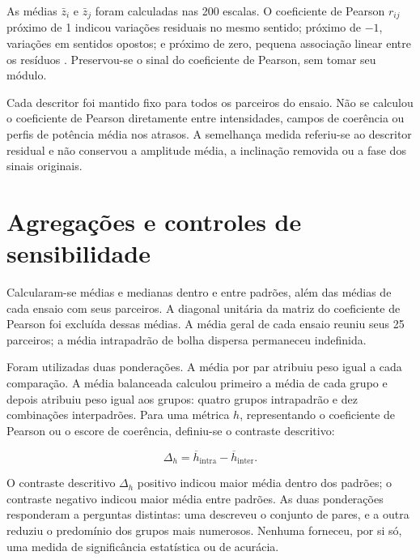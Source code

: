 \noindent
As médias $\bar z_i$ e $\bar z_j$ foram calculadas nas 200 escalas. O coeficiente
de Pearson $r_{ij}$ próximo de 1 indicou variações residuais no mesmo sentido;
próximo de $-1$, variações em sentidos opostos; e próximo de zero, pequena
associação linear entre os resíduos \cite{cunningham2020}. Preservou-se o sinal
do coeficiente de Pearson, sem tomar seu módulo.

Cada descritor foi mantido fixo para todos os parceiros do ensaio. Não se calculou
o coeficiente de Pearson diretamente entre intensidades, campos de coerência ou
perfis de potência média nos atrasos. A semelhança medida referiu-se ao descritor
residual e não conservou a amplitude média, a inclinação removida ou a fase dos
sinais originais.

\section{Agregações e controles de sensibilidade}\label{sec:met-agregacao}

Calcularam-se médias e medianas dentro e entre padrões, além das médias de cada
ensaio com seus parceiros. A diagonal unitária da matriz do coeficiente de
Pearson foi excluída dessas médias. A média geral de cada ensaio reuniu seus 25
parceiros; a média intrapadrão de bolha dispersa permaneceu indefinida.

Foram utilizadas duas ponderações. A média por par atribuiu peso igual a cada
comparação. A média balanceada calculou primeiro a média de cada grupo e depois
atribuiu peso igual aos grupos: quatro grupos intrapadrão e dez combinações
interpadrões. Para uma métrica $h$, representando o coeficiente de Pearson ou o
escore de coerência, definiu-se o contraste descritivo:

\begin{equation}\label{eq:met-contraste}
  \Delta_h=\overline h_{\mathrm{intra}}-\overline h_{\mathrm{inter}}.
\end{equation}

\noindent
O contraste descritivo $\Delta_h$ positivo indicou maior média dentro dos padrões;
o contraste negativo indicou maior média entre padrões. As duas ponderações
responderam a perguntas distintas: uma descreveu o conjunto de pares, e a outra
reduziu o predomínio dos grupos mais numerosos. Nenhuma forneceu, por si só,
uma medida de significância estatística ou de acurácia.


